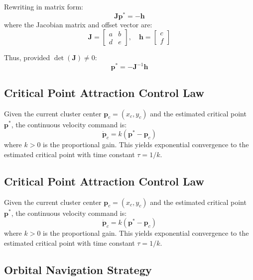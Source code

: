 \documentclass[lettersize,journal]{IEEEtran}
\begin{document}
Rewriting in matrix form:
\begin{equation}
\mathbf{J}\mathbf{p}^* = -\mathbf{h}
\end{equation}
where the Jacobian matrix and offset vector are:
\begin{equation}
\mathbf{J} = \begin{bmatrix} a & b \\ d & e \end{bmatrix}, \quad \mathbf{h} = \begin{bmatrix} c \\ f \end{bmatrix}
\end{equation}

Thus, provided $\det(\mathbf{J}) \neq 0$:
\begin{equation}
\mathbf{p}^* = -\mathbf{J}^{-1}\mathbf{h}
\end{equation}

\subsection{Critical Point Attraction Control Law}
Given the current cluster center $\mathbf{p}_c = (x_c, y_c)$ and the estimated critical point $\mathbf{p}^*$, the continuous velocity command is:
\begin{equation}
\dot{\mathbf{p}}_c = k(\mathbf{p}^* - \mathbf{p}_c)
\end{equation}
where $k > 0$ is the proportional gain. This yields exponential convergence to the estimated critical point with time constant $\tau = 1/k$.

\subsection{Critical Point Attraction Control Law}

Given the current cluster center $\mathbf{p}_c = (x_c, y_c)$ and the estimated critical point $\mathbf{p}^*$, the continuous velocity command is:
\begin{equation}
\dot{\mathbf{p}}_c = k(\mathbf{p}^* - \mathbf{p}_c)
\end{equation}
where $k > 0$ is the proportional gain. This yields exponential convergence to the estimated critical point with time constant $\tau = 1/k$.


\subsection{Orbital Navigation Strategy}
\end{document}
